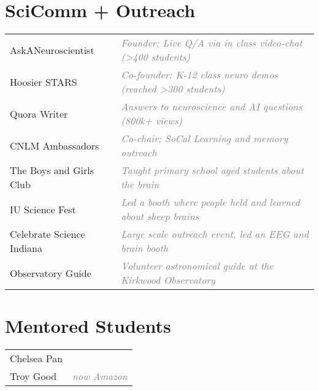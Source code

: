 \documentclass[10pt]{cooperCV2}
\begin{document}
\section{SciComm + Outreach}

\begin{longtable}{@{} l @{\extracolsep{\fill}}  l @{}}
	 
	AskANeuroscientist & \textcolor{grey}{ \textit{Founder; Live Q/A via in class video-chat (>400 students)}} \\
	 
	Hoosier STARS & \textcolor{grey}{ \textit{Co-founder; K-12 class neuro demos (reached >300 students)}} \\
	 
	Quora Writer & \textcolor{grey}{ \textit{Answers to neuroscience and AI questions (800k+ views)}} \\
	 
	CNLM Ambassadors & \textcolor{grey}{ \textit{Co-chair; SoCal Learning and memory outreach}} \\
	 
	The Boys and Girls Club & \textcolor{grey}{ \textit{Taught primary school aged students about the brain}} \\
	 
	IU Science Fest & \textcolor{grey}{ \textit{Led a booth where people held and learned about sheep brains}} \\
	 
	Celebrate Science Indiana & \textcolor{grey}{ \textit{Large scale outreach event, led an EEG and brain booth}} \\
	 
	Observatory Guide & \textcolor{grey}{ \textit{Volunteer astronomical guide at the Kirkwood Observatory}} \\
	
\end{longtable}






%	






\section{Mentored Students}
\begin{longtable}{@{} l  l @{}}
 
Chelsea Pan &  \\
 
Troy Good &  \textcolor{gray}{\textit{ now Amazon}}  \\

\end{longtable}
\end{document}
